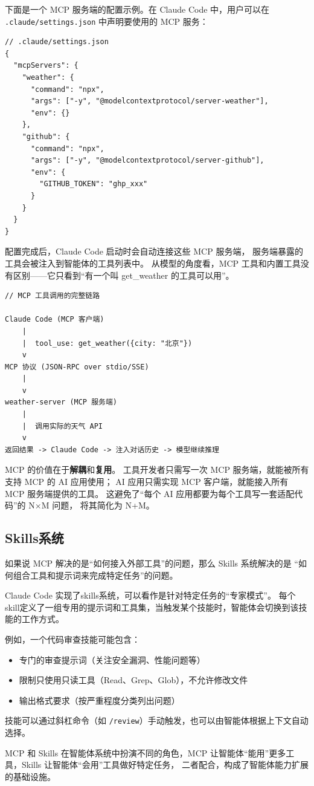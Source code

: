 下面是一个 MCP 服务端的配置示例。在 Claude Code 中，用户可以在
\texttt{.claude/settings.json} 中声明要使用的 MCP 服务：

\begin{verbatim}
// .claude/settings.json
{
  "mcpServers": {
    "weather": {
      "command": "npx",
      "args": ["-y", "@modelcontextprotocol/server-weather"],
      "env": {}
    },
    "github": {
      "command": "npx",
      "args": ["-y", "@modelcontextprotocol/server-github"],
      "env": {
        "GITHUB_TOKEN": "ghp_xxx"
      }
    }
  }
}
\end{verbatim}

配置完成后，Claude Code 启动时会自动连接这些 MCP 服务端，
服务端暴露的工具会被注入到智能体的工具列表中。
从模型的角度看，MCP 工具和内置工具没有区别——它只看到“有一个叫 get\_weather 的工具可以用”。

\begin{verbatim}
// MCP 工具调用的完整链路

Claude Code (MCP 客户端)
    |
    |  tool_use: get_weather({city: "北京"})
    v
MCP 协议 (JSON-RPC over stdio/SSE)
    |
    v
weather-server (MCP 服务端)
    |
    |  调用实际的天气 API
    v
返回结果 -> Claude Code -> 注入对话历史 -> 模型继续推理
\end{verbatim}

MCP 的价值在于\textbf{解耦}和\textbf{复用}。
工具开发者只需写一次 MCP 服务端，就能被所有支持 MCP 的 AI 应用使用；
AI 应用只需实现 MCP 客户端，就能接入所有 MCP 服务端提供的工具。
这避免了“每个 AI 应用都要为每个工具写一套适配代码”的 N×M 问题，
将其简化为 N+M。

\subsection{Skills系统}
如果说 MCP 解决的是“如何接入外部工具”的问题，那么 Skills 系统解决的是
“如何组合工具和提示词来完成特定任务”的问题。

Claude Code 实现了skills系统，可以看作是针对特定任务的“专家模式”。
每个skill定义了一组专用的提示词和工具集，当触发某个技能时，智能体会切换到该技能的工作方式。

例如，一个代码审查技能可能包含：
\begin{itemize}
	\item 专门的审查提示词（关注安全漏洞、性能问题等）
	\item 限制只使用只读工具（Read、Grep、Glob），不允许修改文件
	\item 输出格式要求（按严重程度分类列出问题）
\end{itemize}

技能可以通过斜杠命令（如 \texttt{/review}）手动触发，也可以由智能体根据上下文自动选择。

MCP 和 Skills 在智能体系统中扮演不同的角色，MCP 让智能体“能用”更多工具，Skills 让智能体“会用”工具做好特定任务，
二者配合，构成了智能体能力扩展的基础设施。
